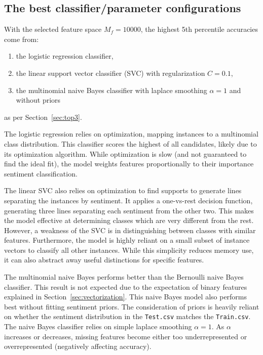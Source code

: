 \documentclass[11pt]{article}
\begin{document}
\subsection{The best classifier/parameter configurations}\label{sec:bestparams}

With the selected feature space $M_f = 10000$, the highest 5th percentile accuracies come from:
\begin{enumerate}
	\item the logistic regression classifier,
 	\item the linear support vector classifier (SVC) with regularization $C = 0.1$,
  	\item the multinomial naive Bayes classifier with laplace smoothing $\alpha = 1$ and without priors
\end{enumerate}
as per Section~\ref{sec:top3}.

The logistic regression relies on optimization, mapping instances to a multinomial class distribution.
This classifier scores the highest of all candidates, likely due to its optimization algorithm.
While optimization is slow (and not guaranteed to find the ideal fit), 
the model weights features proportionally to their importance sentiment classification.


The linear SVC also relies on optimization to find supports to generate lines separating the instances by sentiment.
It applies a one-vs-rest decision function, generating three lines separating each sentiment from the other two.
This makes the model effective at determining classes which are very different from the rest.
However, a weakness of the SVC is in distinguishing between classes with similar features. 
Furthermore, the model is highly reliant on a small subset of instance vectors to classify all other instances. 
While this simplicity reduces memory use, it can also abstract away useful distinctions for specific features.


The multinomial naive Bayes performs better than the Bernoulli naive Bayes classifier.
This result is not expected due to the expectation of binary features explained in Section~\ref{sec:vectorization}.
This naive Bayes model also performs best without fitting sentiment priors.
The consideration of priors is heavily reliant on whether the sentiment distribution in the \texttt{Test.csv} matches the \texttt{Train.csv}.
The naive Bayes classifier relies on simple laplace smoothing $\alpha = 1$. 
As $\alpha$ increases or decreases,
missing features become either too underrepresented or overrepresented (negatively affecting accuracy).
\end{document}
